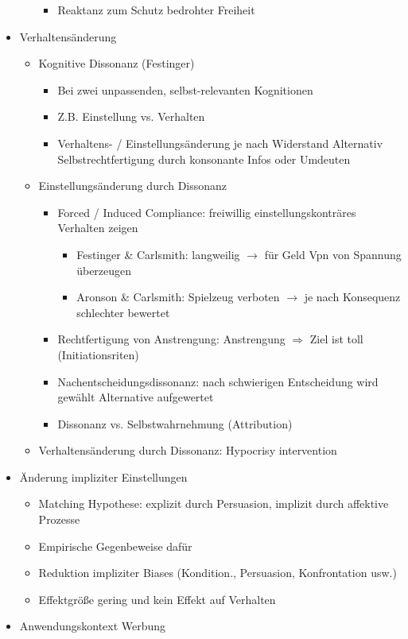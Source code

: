 \documentclass[11pt, paper=a4, twocolumn]{scrartcl}
\begin{document}
\begin{itemize}
\begin{itemize}
\begin{itemize}
							\item Reaktanz zum Schutz bedrohter Freiheit
						\end{itemize}
				\end{itemize}
			\item Verhaltensänderung
				\begin{itemize}
					\item Kognitive Dissonanz (Festinger)
						\begin{itemize}
							\item Bei zwei unpassenden, selbst-relevanten Kognitionen
							\item Z.B. Einstellung vs. Verhalten
							\item Verhaltens- / Einstellungsänderung je nach Widerstand
								Alternativ Selbstrechtfertigung durch konsonante Infos oder Umdeuten
						\end{itemize}
					\item Einstellungsänderung durch Dissonanz
						\begin{itemize}
							\item Forced / Induced Compliance: freiwillig einstellungskonträres Verhalten zeigen
								\begin{itemize}
									\item Festinger \& Carlsmith: langweilig $\rightarrow$ für Geld Vpn von Spannung 
										überzeugen
									\item Aronson \& Carlsmith: Spielzeug verboten $\rightarrow$ je nach Konsequenz 
										schlechter 
								bewertet
								\end{itemize}
							\item Rechtfertigung von Anstrengung: Anstrengung $\Rightarrow$ Ziel ist toll (Initiationsriten)
							\item Nachentscheidungsdissonanz: nach schwierigen Entscheidung wird gewählt Alternative 
								aufgewertet
							\item Dissonanz vs. Selbstwahrnehmung (Attribution)
						\end{itemize}
					\item Verhaltensänderung durch Dissonanz: Hypocrisy intervention
				\end{itemize}
			\item Änderung impliziter Einstellungen
				\begin{itemize}
					\item Matching Hypothese: explizit durch Persuasion, implizit durch affektive Prozesse
					\item Empirische Gegenbeweise dafür
					\item Reduktion impliziter Biases (Kondition., Persuasion, Konfrontation usw.)
					\item Effektgröße gering und kein Effekt auf Verhalten
				\end{itemize}
			\item Anwendungskontext Werbung
		\end{itemize}
	
\end{document}
